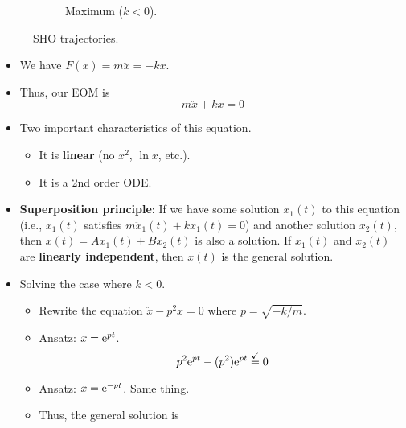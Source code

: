 \documentclass[../notes.tex]{subfiles}
\begin{document}
\begin{itemize}
\begin{figure}[H]
\begin{subfigure}[b]{0.35\linewidth}
            \caption{Maximum ($k<0$).}
            \label{fig:SHOtrajectoryb}
        \end{subfigure}
        \caption{SHO trajectories.}
        \label{fig:SHOtrajectory}
    \end{figure}
    \begin{itemize}
        \item We have $F(x)=m\ddot{x}=-kx$.
        \item Thus, our EOM is
        \begin{equation*}
            m\ddot{x}+kx = 0
        \end{equation*}
        \item Two important characteristics of this equation.
        \begin{itemize}
            \item It is \textbf{linear} (no $x^2$, $\ln x$, etc.).
            \item It is a 2nd order ODE.
        \end{itemize}
        \item \textbf{Superposition principle}: If we have some solution $x_1(t)$ to this equation (i.e., $x_1(t)$ satisfies $m\ddot{x}_1(t)+kx_1(t)=0$) and another solution $x_2(t)$, then $x(t)=Ax_1(t)+Bx_2(t)$ is also a solution. If $x_1(t)$ and $x_2(t)$ are \textbf{linearly independent}, then $x(t)$ is the general solution.
        \item Solving the case where $k<0$.
        \begin{itemize}
            \item Rewrite the equation $\ddot{x}-p^2x=0$ where $p=\sqrt{-k/m}$.
            \item Ansatz: $x=\e[pt]$.
            \begin{equation*}
                p^2\e[pt]-(p^2)\e[pt] \stackrel{\checkmark}{=} 0
            \end{equation*}
            \item Ansatz: $x=\e[-pt]$. Same thing.
            \item Thus, the general solution is
            \begin{equation*}

\end{equation*}
\end{itemize}
\end{itemize}
\end{itemize}
\end{document}
